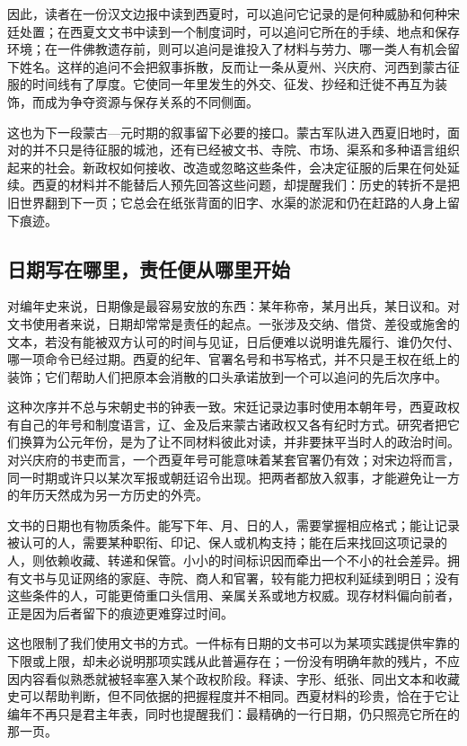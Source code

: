 因此，读者在一份汉文边报中读到西夏时，可以追问它记录的是何种威胁和何种宋廷处置；在西夏文文书中读到一个制度词时，可以追问它所在的手续、地点和保存环境；在一件佛教遗存前，则可以追问是谁投入了材料与劳力、哪一类人有机会留下姓名。这样的追问不会把叙事拆散，反而让一条从夏州、兴庆府、河西到蒙古征服的时间线有了厚度。它使同一年里发生的外交、征发、抄经和迁徙不再互为装饰，而成为争夺资源与保存关系的不同侧面。

这也为下一段蒙古—元时期的叙事留下必要的接口。蒙古军队进入西夏旧地时，面对的并不只是待征服的城池，还有已经被文书、寺院、市场、渠系和多种语言组织起来的社会。新政权如何接收、改造或忽略这些条件，会决定征服的后果在何处延续。西夏的材料并不能替后人预先回答这些问题，却提醒我们：历史的转折不是把旧世界翻到下一页；它总会在纸张背面的旧字、水渠的淤泥和仍在赶路的人身上留下痕迹。

\subsection{日期写在哪里，责任便从哪里开始}

对编年史来说，日期像是最容易安放的东西：某年称帝，某月出兵，某日议和。对文书使用者来说，日期却常常是责任的起点。一张涉及交纳、借贷、差役或施舍的文本，若没有能被双方认可的时间与见证，日后便难以说明谁先履行、谁仍欠付、哪一项命令已经过期。西夏的纪年、官署名号和书写格式，并不只是王权在纸上的装饰；它们帮助人们把原本会消散的口头承诺放到一个可以追问的先后次序中。

这种次序并不总与宋朝史书的钟表一致。宋廷记录边事时使用本朝年号，西夏政权有自己的年号和制度语言，辽、金及后来蒙古诸政权又各有纪时方式。研究者把它们换算为公元年份，是为了让不同材料彼此对读，并非要抹平当时人的政治时间。对兴庆府的书吏而言，一个西夏年号可能意味着某套官署仍有效；对宋边将而言，同一时期或许只以某次军报或朝廷诏令出现。把两者都放入叙事，才能避免让一方的年历天然成为另一方历史的外壳。

文书的日期也有物质条件。能写下年、月、日的人，需要掌握相应格式；能让记录被认可的人，需要某种职衔、印记、保人或机构支持；能在后来找回这项记录的人，则依赖收藏、转递和保管。小小的时间标识因而牵出一个不小的社会差异。拥有文书与见证网络的家庭、寺院、商人和官署，较有能力把权利延续到明日；没有这些条件的人，可能更倚重口头信用、亲属关系或地方权威。现存材料偏向前者，正是因为后者留下的痕迹更难穿过时间。

这也限制了我们使用文书的方式。一件标有日期的文书可以为某项实践提供牢靠的下限或上限，却未必说明那项实践从此普遍存在；一份没有明确年款的残片，不应因内容看似熟悉就被轻率塞入某个政权阶段。释读、字形、纸张、同出文本和收藏史可以帮助判断，但不同依据的把握程度并不相同。西夏材料的珍贵，恰在于它让编年不再只是君主年表，同时也提醒我们：最精确的一行日期，仍只照亮它所在的那一页。

